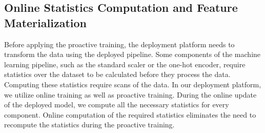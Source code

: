 

\subsection{Online Statistics Computation and Feature Materialization}
Before applying the proactive training, the deployment platform needs to transform the data using the deployed pipeline.
Some components of the machine learning pipeline, such as the standard scaler or the one-hot encoder, require statistics over the dataset to be calculated before they process the data.
Computing these statistics require scans of the data.
In our deployment platform, we utilize online training as well as proactive training.
During the online update of the deployed model, we compute all the necessary statistics for every component.
Online computation of the required statistics eliminates the need to recompute the statistics during the proactive training.

